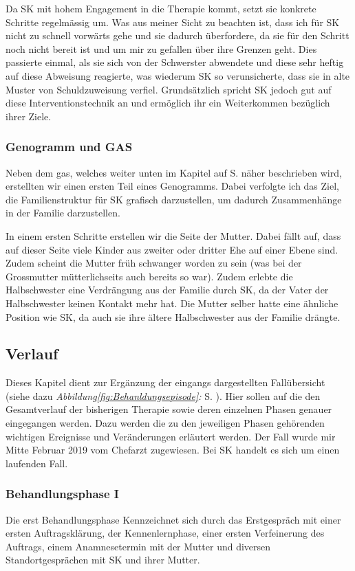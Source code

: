 Da SK mit hohem Engagement in die Therapie kommt, setzt sie konkrete Schritte regelmässig um. Was aus meiner Sicht zu beachten ist, dass ich für SK nicht zu schnell vorwärts gehe und sie dadurch überfordere, da sie für den Schritt noch nicht bereit ist und um mir zu gefallen über ihre Grenzen geht. Dies passierte einmal, als sie sich von der Schwerster abwendete und diese sehr heftig auf diese Abweisung reagierte, was wiederum SK so verunsicherte, dass sie in alte Muster von Schuldzuweisung verfiel. Grundsätzlich spricht SK jedoch gut auf diese Interventionstechnik an und ermöglich ihr ein Weiterkommen bezüglich ihrer Ziele.

\subsubsection{Genogramm und GAS}
Neben dem \ac{gas}, welches weiter unten im Kapitel  auf S. \pageref{sec:Evaluationsverfahren} näher beschrieben wird, erstellten wir einen ersten Teil eines Genogramms. Dabei verfolgte ich das Ziel, die Familienstruktur für SK grafisch darzustellen, um dadurch Zusammenhänge in der Familie darzustellen. 

In einem ersten Schritte erstellen wir die Seite der Mutter. Dabei fällt auf, dass auf dieser Seite viele Kinder aus zweiter oder dritter Ehe auf einer Ebene sind. Zudem scheint die Mutter früh schwanger worden zu sein (was bei der Grossmutter mütterlichseits auch bereits so war). Zudem erlebte die Halbschwester eine Verdrängung aus der Familie durch SK, da der Vater der Halbschwester keinen Kontakt mehr hat. Die Mutter selber hatte eine ähnliche Position wie SK, da auch sie ihre ältere Halbschwester aus der Familie drängte.

\subsection{Verlauf}\label{Verlauf} 
Dieses Kapitel dient zur Ergänzung der eingangs dargestellten Fallübersicht (siehe dazu \textit{Abbildung\ref{fig:Behanldungsepisode}: } S. \pageref{fig:Behanldungsepisode}). Hier sollen auf die den Gesamtverlauf der bisherigen Therapie sowie deren einzelnen Phasen genauer eingegangen werden. Dazu werden die zu den jeweiligen Phasen gehörenden wichtigen Ereignisse und Veränderungen erläutert werden. Der Fall wurde mir Mitte Februar 2019 vom Chefarzt zugewiesen. Bei SK handelt es sich um einen laufenden Fall. 
\subsubsection{Behandlungsphase I}
Die erst Behandlungsphase Kennzeichnet sich durch das Erstgespräch mit einer ersten Auftragsklärung, der Kennenlernphase, einer ersten Verfeinerung des Auftrags, einem Anamnesetermin mit der Mutter und diversen Standortgesprächen mit SK und ihrer Mutter. 

